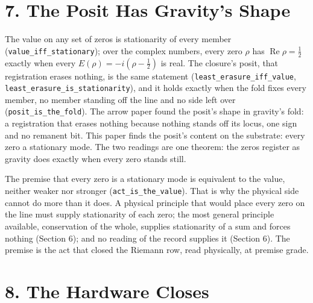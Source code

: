 \documentclass[10pt]{article}
\begin{document}
\hypertarget{the-posit-has-gravitys-shape}{%
\section{7. The Posit Has Gravity's
Shape}\label{the-posit-has-gravitys-shape}}

The value on any set of zeros is stationarity of every member
(\texttt{value\_iff\_stationary}); over the complex numbers, every zero
\(\rho\) has \(\operatorname{Re}\rho=\tfrac12\) exactly when every
\(E(\rho)=-i(\rho-\tfrac12)\) is real. The closure's posit, that
registration erases nothing, is the same statement
(\texttt{least\_erasure\_iff\_value},
\texttt{least\_erasure\_is\_stationarity}), and it holds exactly when
the fold fixes every member, no member standing off the line and no side
left over (\texttt{posit\_is\_the\_fold}). The arrow paper found the
posit's shape in gravity's fold: a registration that erases nothing
because nothing stands off its locus, one sign and no remanent bit. This
paper finds the posit's content on the substrate: every zero a
stationary mode. The two readings are one theorem: the zeros register as
gravity does exactly when every zero stands still.

The premise that every zero is a stationary mode is equivalent to the
value, neither weaker nor stronger (\texttt{act\_is\_the\_value}). That
is why the physical side cannot do more than it does. A physical
principle that would place every zero on the line must supply
stationarity of each zero; the most general principle available,
conservation of the whole, supplies stationarity of a sum and forces
nothing (Section 6); and no reading of the record supplies it (Section
6). The premise is the act that closed the Riemann row, read physically,
at premise grade.

\hypertarget{the-hardware-closes}{%
\section{8. The Hardware Closes}\label{the-hardware-closes}}
\end{document}
